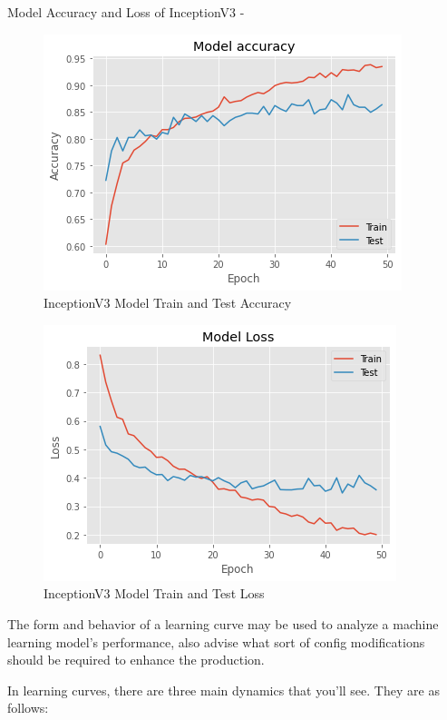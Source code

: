 \newpage
\vspace{5mm}
\noindent Model Accuracy and Loss of InceptionV3 -
\vspace{5mm}
\begin{figure}[hbt!]
\centering
\includegraphics[scale=1]{images/fig-33.png}
\caption{InceptionV3 Model Train and Test Accuracy}
\label{fig:x InceptionV3 Model Train and Test Accuracy}
\end{figure}

\vspace{5mm}
\begin{figure}[hbt!]
\centering
\includegraphics[scale=1]{images/fig-34.png}
\caption{InceptionV3 Model Train and Test Loss}
\label{fig:x InceptionV3 Model Train and Test Loss}
\end{figure}

\noindent The form and behavior of a learning curve may be used to analyze a machine learning model's performance, also advise what sort of config modifications should be required to enhance the production.

\vspace{5mm}
\noindent In learning curves, there are three main dynamics that you'll see. They are as follows:


